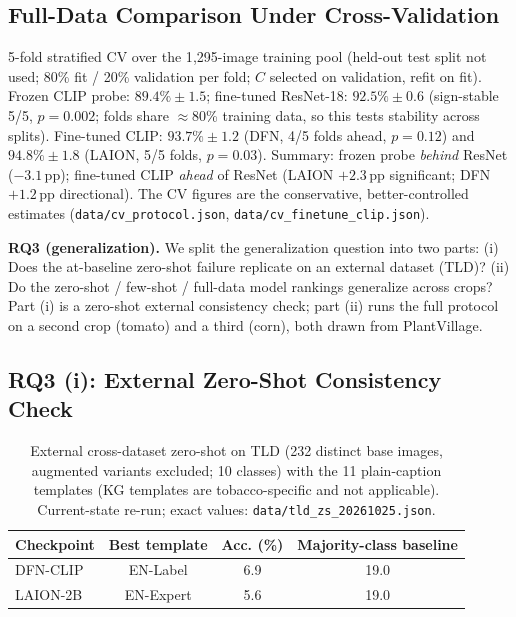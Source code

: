 \documentclass[10pt,a4paper]{article}
\begin{document}
\subsection{Full-Data Comparison Under Cross-Validation}
\label{sec:cv}

5-fold stratified CV over the 1{,}295-image training pool (held-out test split not used; 80\% fit / 20\% validation per fold; $C$ selected on validation, refit on fit). Frozen CLIP probe: $89.4\%\pm1.5$; fine-tuned ResNet-18: $92.5\%\pm0.6$ (sign-stable 5/5, $p{=}0.002$; folds share $\approx$80\% training data, so this tests stability across splits). Fine-tuned CLIP: $93.7\%\pm1.2$ (DFN, 4/5 folds ahead, $p{=}0.12$) and $94.8\%\pm1.8$ (LAION, 5/5 folds, $p{=}0.03$). Summary: frozen probe \emph{behind} ResNet ($-3.1$\,pp); fine-tuned CLIP \emph{ahead} of ResNet (LAION $+2.3$\,pp significant; DFN $+1.2$\,pp directional). The CV figures are the conservative, better-controlled estimates (\texttt{data/cv\_protocol.json}, \texttt{data/cv\_finetune\_clip.json}).

\textbf{RQ3 (generalization).} We split the generalization question into two parts: (i) Does the at-baseline zero-shot failure replicate on an external dataset (TLD)? (ii) Do the zero-shot / few-shot / full-data model rankings generalize across crops? Part (i) is a zero-shot external consistency check; part (ii) runs the full protocol on a second crop (tomato) and a third (corn), both drawn from PlantVillage.

\subsection{RQ3 (i): External Zero-Shot Consistency Check}

\begin{table}[!ht]
\centering
\caption{External cross-dataset zero-shot on TLD (232 distinct base images, augmented variants excluded; 10 classes) with the 11 plain-caption templates (KG templates are tobacco-specific and not applicable). Current-state re-run; exact values: \texttt{data/tld\_zs\_20261025.json}.}
\label{tab:tld}
\begin{tabular}{lccc}
\toprule
\textbf{Checkpoint} & \textbf{Best template} & \textbf{Acc. (\%)} & \textbf{Majority-class baseline} \\
\midrule
DFN-CLIP   & EN-Label  & 6.9  & 19.0 \\
LAION-2B   & EN-Expert & 5.6  & 19.0 \\
\bottomrule
\end{tabular}
\end{table}
\end{document}
